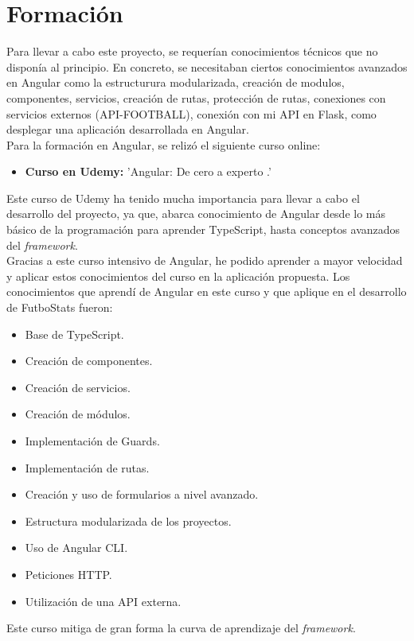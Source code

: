 \section{Formación}
Para llevar a cabo este proyecto, se requerían conocimientos técnicos que no disponía al principio. En concreto, se necesitaban ciertos conocimientos avanzados en Angular como la estructurura modularizada, creación de modulos, componentes, servicios, creación de rutas, protección de rutas, conexiones con servicios externos (API-FOOTBALL), conexión con mi API en Flask, como desplegar una aplicación desarrollada en Angular. \\
Para la formación en Angular, se relizó el siguiente curso online:
\begin{itemize}
    \item \textbf{Curso en Udemy:} 'Angular: De cero a experto \cite{udemy:latex}.'
\end{itemize}
Este curso de Udemy ha tenido mucha importancia para llevar a cabo el desarrollo del proyecto, ya que, abarca conocimiento de Angular desde lo más básico de la programación para aprender TypeScript, hasta conceptos avanzados del \textit{framework}. \\
Gracias a este curso intensivo de Angular, he podido aprender a mayor velocidad y aplicar estos conocimientos del curso en la aplicación propuesta.
Los conocimientos que aprendí de Angular en este curso y que aplique en el desarrollo de FutboStats fueron:
\begin{itemize}
    \item Base de TypeScript.
    \item Creación de componentes.
    \item Creación de servicios.
    \item Creación de módulos.
    \item Implementación de Guards.
    \item Implementación de rutas.
    \item Creación y uso de formularios a nivel avanzado.
    \item Estructura modularizada de los proyectos.
    \item Uso de Angular CLI.
    \item Peticiones HTTP.
    \item Utilización de una API externa.
\end{itemize}

Este curso mitiga de gran forma la curva de aprendizaje del \textit{framework}.

